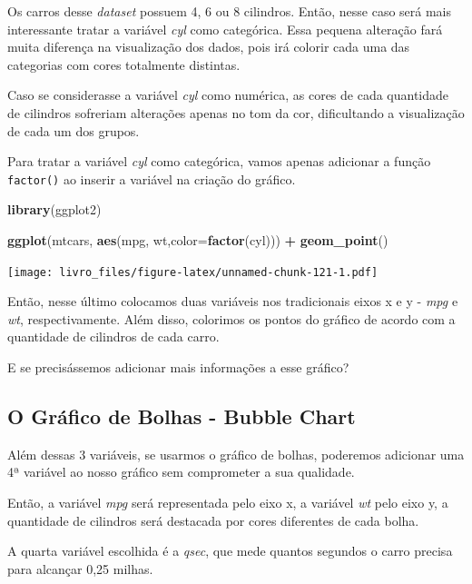 \documentclass[
]{book}
\newenvironment{Shaded}{\begin{snugshade}}{\end{snugshade}}
\newcommand{\DataTypeTok}[1]{\textcolor[rgb]{0.13,0.29,0.53}{#1}}
\newcommand{\KeywordTok}[1]{\textcolor[rgb]{0.13,0.29,0.53}{\textbf{#1}}}
\newcommand{\NormalTok}[1]{#1}
\newcommand{\OperatorTok}[1]{\textcolor[rgb]{0.81,0.36,0.00}{\textbf{#1}}}
\newcommand{\StringTok}[1]{\textcolor[rgb]{0.31,0.60,0.02}{#1}}
\begin{document}
Os carros desse \emph{dataset} possuem 4, 6 ou 8 cilindros. Então, nesse
caso será mais interessante tratar a variável \emph{cyl} como
categórica. Essa pequena alteração fará muita diferença na visualização
dos dados, pois irá colorir cada uma das categorias com cores totalmente
distintas.

Caso se considerasse a variável \emph{cyl} como numérica, as cores de
cada quantidade de cilindros sofreriam alterações apenas no tom da cor,
dificultando a visualização de cada um dos grupos.

Para tratar a variável \emph{cyl} como categórica, vamos apenas
adicionar a função \texttt{factor()} ao inserir a variável na criação do
gráfico.

\begin{Shaded}
\begin{Highlighting}[]
\KeywordTok{library}\NormalTok{(ggplot2)}

\KeywordTok{ggplot}\NormalTok{(mtcars, }\KeywordTok{aes}\NormalTok{(mpg, wt,}\DataTypeTok{color=}\KeywordTok{factor}\NormalTok{(cyl))) }\OperatorTok{+}
\StringTok{  }\KeywordTok{geom_point}\NormalTok{()}
\end{Highlighting}
\end{Shaded}

\texttt{[image: livro\_files/figure-latex/unnamed-chunk-121-1.pdf]}

Então, nesse último colocamos duas variáveis nos tradicionais eixos x e
y - \emph{mpg} e \emph{wt}, respectivamente. Além disso, colorimos os
pontos do gráfico de acordo com a quantidade de cilindros de cada carro.

E se precisássemos adicionar mais informações a esse gráfico?

\hypertarget{o-gruxe1fico-de-bolhas---bubble-chart}{%
\subsection{O Gráfico de Bolhas - Bubble
Chart}\label{o-gruxe1fico-de-bolhas---bubble-chart}}

Além dessas 3 variáveis, se usarmos o gráfico de bolhas, poderemos
adicionar uma 4ª variável ao nosso gráfico sem comprometer a sua
qualidade.

Então, a variável \emph{mpg} será representada pelo eixo x, a variável
\emph{wt} pelo eixo y, a quantidade de cilindros será destacada por
cores diferentes de cada bolha.

A quarta variável escolhida é a \emph{qsec}, que mede quantos segundos o
carro precisa para alcançar 0,25 milhas.
\end{document}
